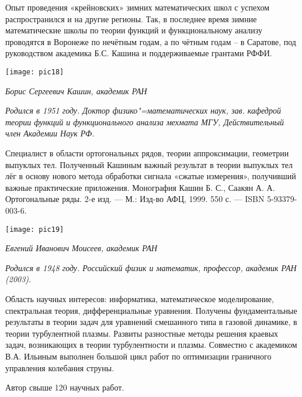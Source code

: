 Опыт проведения «крейновских» зимних математических школ с успехом распространился и на другие регионы. Так, в последнее время зимние математические школы по теории функций и функциональному анализу проводятся в Воронеже по нечётным годам, а по чётным годам – в Саратове, под руководством академика Б.С. Кашина и поддерживаемые грантами РФФИ.

\begin{center}

\texttt{[image: pic18]}


{\it Борис Сергеевич Кашин, академик РАН
}
\end{center}


{\it Родился в 1951 году. Доктор физико"=математических наук, зав. кафедрой теории функций и функционального анализа мехмата МГУ, Действительный член Академии Наук РФ.

 Специалист в области ортогональных рядов, теории аппроксимации, геометрии выпуклых тел. Полученный Кашиным важный результат в теории выпуклых тел лёг в основу нового метода обработки сигнала «сжатые измерения», получивший важные практические приложения. Монография Кашин Б. С., Саакян А. А.  Ортогональные ряды. 2-е изд. — М.: Изд-во АФЦ, 1999. 550 с. — ISBN 5-93379-003-6.}


\begin{center}

\texttt{[image: pic19]}


{\it Евгений Иванович Моисеев, академик РАН
}
\end{center}

{\it
Родился в 1948 году. Российский физик и математик, профессор, академик РАН (2003).

Область научных интересов: информатика, математическое моделирование, спектральная теория, дифференциальные уравнения. Получены фундаментальные результаты в теории задач для уравнений смешанного типа в газовой динамике, в теории турбулентной плазмы. Развиты разностные методы решения краевых задач, возникающих в теории турбулентности и плазмы. Совместно с академиком В.А. Ильиным выполнен большой цикл работ по оптимизации граничного управления колебания струны.

Автор свыше 120 научных работ.
}

